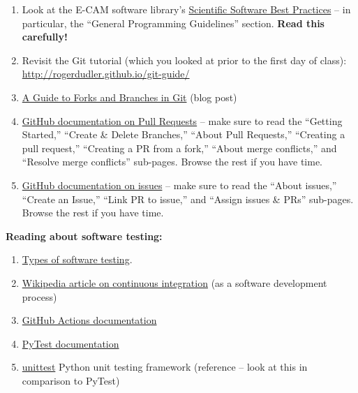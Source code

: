 \documentclass[10pt]{article}
\begin{document}
\begin{enumerate}

\item Look at the E-CAM software library's
  \href{https://e-cam.readthedocs.io/en/latest/best-practices/index.html#best-practices}{Scientific
  Software Best Practices} -- in particular, the ``General Programming
Guidelines'' section.  \textbf{Read this carefully!}

\item Revisit the Git tutorial (which you looked at prior to the first
  day of class):
  \url{http://rogerdudler.github.io/git-guide/}

\item
  \href{https://graphite.com/guides/git-fork-vs-branch}{A  Guide to Forks and Branches in Git}  (blog post)

\item \href{https://docs.github.com/en/pull-requests}{GitHub
    documentation on Pull Requests} -- make sure to read the ``Getting Started,''
  ``Create \& Delete Branches,'' ``About Pull Requests,'' ``Creating a
  pull request,''  ``Creating a PR from a fork,'' ``About merge
  conflicts,'' and ``Resolve merge conflicts'' sub-pages.  Browse the
  rest if you have time.

\item \href{https://docs.github.com/en/issues}{GitHub documentation on
  issues} -- make sure to read the ``About issues,'' ``Create an
Issue,'' ``Link PR to issue,'' and ``Assign issues \& PRs''
sub-pages.  Browse the rest if you have time.

\end{enumerate}


\vspace{5mm}

\noindent
\textbf{Reading about software testing:}

\begin{enumerate}

\item
  \href{https://www.atlassian.com/continuous-delivery/software-testing/types-of-software-testing}{Types
  of software testing}.  

\item
  \href{https://en.wikipedia.org/wiki/Continuous_integration}{Wikipedia
  article on continuous integration}  (as a software development process)


\item \href{https://docs.github.com/en/actions}{GitHub Actions documentation}

\item \href{https://docs.pytest.org/en/7.2.x/}{PyTest documentation}

\item \href{https://docs.python.org/3/library/unittest.html}{unittest}
  Python unit testing framework  (reference -- look at this in
  comparison to PyTest)

  \end{enumerate}
\end{document}

